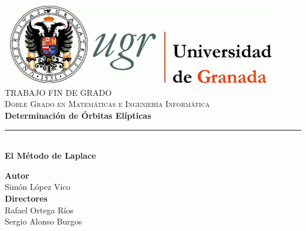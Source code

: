 \begin{titlepage}
 
 
\newlength{\centeroffset}
\setlength{\centeroffset}{-0.5\oddsidemargin}
\addtolength{\centeroffset}{0.5\evensidemargin}
\thispagestyle{empty}

\noindent\hspace*{\centeroffset}

\begin{minipage}{\textwidth}
	\centering
	\includegraphics[width=0.9\textwidth]{images/logo_ugr.jpg}\\[1.2cm]
	
	\textsc{\Large TRABAJO FIN DE GRADO\\[0.2cm]}
	\textsc{Doble Grado en Matemáticas e Ingeniería Informática}\\[0.8cm]
	{\huge\bfseries Determinación de Órbitas Elípticas\\
	}
	\noindent\rule[-1ex]{\textwidth}{1pt}\\[2.5ex]
	{\Large\bfseries El Método de Laplace}
\end{minipage}

\vspace{1cm}

\noindent\hspace*{\centeroffset}

\begin{minipage}{\textwidth}
	\centering
	\textbf{Autor}\\ {Simón López Vico}\\[2.5ex]
	\textbf{Directores}\\ {Rafael Ortega Ríos\\Sergio Alonso Burgos}\\[1.5cm]
	

\end{minipage}
\end{titlepage}
